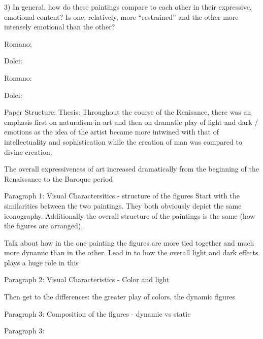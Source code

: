     3)  In general, how do these paintings compare to each other in their
        expressive, emotional content?  Is one, relatively, more “restrained”
        and the other more intensely emotional than the other?

        Romano:

        Dolci:


Romano:

Dolci:


Paper Structure:
    Thesis:
        Throughout the course of the Renisance, there was an emphasis first on
        naturalism in art and then on dramatic play of light and dark /
        emotions as the idea of the artist became more intwined with that of
        intellectuality and sophistication while the creation of man was
        compared to divine creation.

        The overall expressiveness of art increased dramatically from the
        beginning of the Renaissance to the Baroque period

    Paragraph 1: Visual Charactersitics - structure of the figures
        Start with the similarities between the two paintings.  They both
        obviously depict the same iconography.  Additionally the overall
        structure of the paintings is the same (how the figures are arranged).

        Talk about how in the one painting the figures are more tied together
        and much more dynamic than in the other.  Lead in to how the overall
        light and dark effects plays a huge role in this

    Paragraph 2: Visual Characteristics - Color and light

        Then get to the differences: the greater play of colors, the dynamic
        figures

    Paragraph 3: Composition of the figures - dynamic vs static





    Paragraph 3:
        




